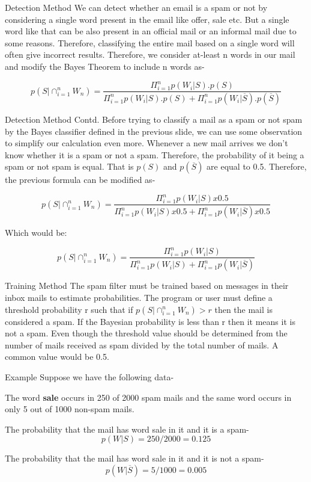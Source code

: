 \begin{frame}{Detection Method}
We can detect whether an email is a spam or not by considering a single word present in the email like offer, sale etc. But a single word like that can be also present in an official mail or an informal mail due to some reasons. Therefore, classifying the entire mail based on a single word will often give incorrect results. Therefore, we consider at-least n words in our mail and modify the Bayes Theorem to include n words as-

$$
p\left(S|\cap_{i=1}^n W_n\right) = \dfrac{\Pi_{i=1}^n p(W_i|S).p(S)}{\Pi_{i=1}^n p(W_i|S).p(S) + \Pi_{i=1}^n p(W_i|\overline{S}).p(\overline{S})}
$$
\end{frame}

\begin{frame}{Detection Method Contd.}
Before trying to classify a mail as a spam or not spam by the Bayes classifier defined in the previous slide, we can use some observation to simplify our calculation even more. Whenever a new mail arrives we don't know whether it is a spam or not a spam. Therefore, the probability of it being a spam or not spam is equal. That is $p(S)$ and $p(\overline{S})$ are equal to 0.5. Therefore, the previous formula can be modified as-

$$
p\left(S|\cap_{i=1}^n W_n\right) = \dfrac{\Pi_{i=1}^n p(W_i|S)x0.5}{\Pi_{i=1}^n p(W_i|S)x0.5 + \Pi_{i=1}^n p(W_i|\overline{S})x0.5}
$$

Which would be:

$$
p\left(S|\cap_{i=1}^n W_n\right) = \dfrac{\Pi_{i=1}^n p(W_i|S)}{\Pi_{i=1}^n p(W_i|S) + \Pi_{i=1}^n p(W_i|\overline{S})}
$$
\end{frame}

\begin{frame}{Training Method}
The spam filter must be trained  based on messages in their inbox mails to estimate probabilities. The program or user must define a threshold probability r such that if $p(S|\cap_{i=1}^n W_n) > r$ then the mail is considered a spam. If the Bayesian probability is less than r then it means it is not a spam. Even though the threshold value should be determined from the number of mails received as spam divided by the total number of mails. A common value would be 0.5.
\end{frame}

\begin{frame}{Example}
Suppose we have the following data-

The word \textbf{sale} occurs in 250 of 2000 spam mails and the same word occurs in only 5 out of 1000 non-spam mails.

The probability that the mail has word sale in it and it is a spam-
$$
p(W|S) = 250/2000 = 0.125
$$

The probability that the mail has word sale in it and it is not a spam-
$$
p(W|\overline{S}) = 5/1000 = 0.005
$$
\end{frame}

